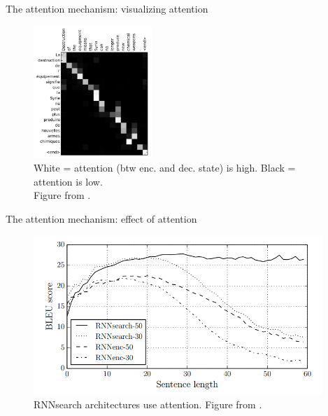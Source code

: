 \documentclass[12pt,aspectratio=169,handout]{beamer}
\begin{document}
\begin{frame}{The attention mechanism: visualizing attention}
	\begin{figure}[h]
		\includegraphics[height=5cm]{translation_heatmap}
		\caption*{White = attention (btw enc. and dec. state) is high. Black = attention is low.\\ Figure from \cite{bahdanau2014neural}.}
	\end{figure}



\end{frame}

\begin{frame}{The attention mechanism: effect of attention}
	\begin{figure}[h]
		\includegraphics[height=6cm]{sequence_length}
		\caption*{RNNsearch architectures use attention. Figure from \cite{bahdanau2014neural}.}
	\end{figure}	
\end{frame}
\end{document}
